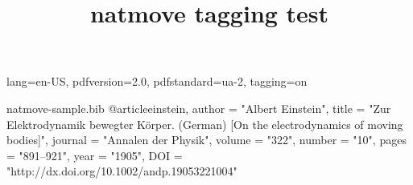 \ifdefined\Uchar\RequirePackage{luatagging}\fi
\DocumentMetadata
  {
    lang=en-US,
    pdfversion=2.0,
    pdfstandard=ua-2,
    tagging=on
  }
\begin{filecontents}{natmove-sample.bib}
@article{einstein,
    author =       "Albert Einstein",
    title =        "{Zur Elektrodynamik bewegter K{\"o}rper}. ({German})
        [{On} the electrodynamics of moving bodies]",
    journal =      "Annalen der Physik",
    volume =       "322",
    number =       "10",
    pages =        "891--921",
    year =         "1905",
    DOI =          "http://dx.doi.org/10.1002/andp.19053221004"
}
\end{filecontents}

\documentclass{article}

\usepackage[numbers,super]{natbib}
\usepackage{natmove}
\usepackage{hyperref}

\title{natmove tagging test}



Some text \cite{einstein} some more text.

Some text ending a sentence \cite{einstein}.




